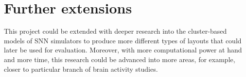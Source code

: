 \documentclass[12pt]{report}
\begin{document}
\section{Further extensions}

This project could be extended with deeper research into the cluster-based models of SNN simulators to produce more different types of layouts that could later be used for evaluation.
Moreover, with more computational power at hand and more time, this research could be advanced into more areas, for example, closer to particular branch of brain activity studies.

\clearpage



\end{document}
